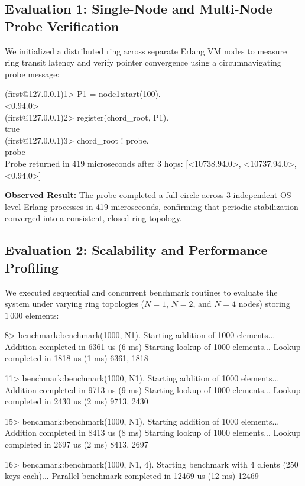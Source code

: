 \documentclass[a4paper, 11pt]{article}
\begin{document}
\subsection{Evaluation 1: Single-Node and Multi-Node Probe Verification}
We initialized a distributed ring across separate Erlang VM nodes to measure ring transit latency and verify pointer convergence using a circumnavigating probe message:
\begin{tcolorbox}[terminalbox]
(first@127.0.0.1)1> P1 = node1:start(100). \\
<0.94.0> \\
(first@127.0.0.1)2> register(chord\_root, P1). \\
true \\
(first@127.0.0.1)3> chord\_root ! probe. \\
probe \\
Probe returned in 419 microseconds after 3 hops: [<10738.94.0>, <10737.94.0>, <0.94.0>]
\end{tcolorbox}
\textbf{Observed Result:} The probe completed a full circle across 3 independent OS-level Erlang processes in 419 microseconds, confirming that periodic stabilization converged into a consistent, closed ring topology.

\subsection{Evaluation 2: Scalability and Performance Profiling}
We executed sequential and concurrent benchmark routines to evaluate the system under varying ring topologies ($N=1$, $N=2$, and $N=4$ nodes) storing $1\,000$ elements:

\begin{tcolorbox}[terminalbox]
8> benchmark:benchmark(1000, N1).
Starting addition of 1000 elements...
Addition completed in 6361 us (6 ms)
Starting lookup of 1000 elements...
Lookup completed in 1818 us (1 ms)
{6361, 1818}

11> benchmark:benchmark(1000, N1).
Starting addition of 1000 elements...
Addition completed in 9713 us (9 ms)
Starting lookup of 1000 elements...
Lookup completed in 2430 us (2 ms)
{9713, 2430}

15> benchmark:benchmark(1000, N1).
Starting addition of 1000 elements...
Addition completed in 8413 us (8 ms)
Starting lookup of 1000 elements...
Lookup completed in 2697 us (2 ms)
{8413, 2697}

16> benchmark:benchmark(1000, N1, 4).
Starting benchmark with 4 clients (250 keys each)...
Parallel benchmark completed in 12469 us (12 ms)
12469
\end{tcolorbox}
\end{document}
